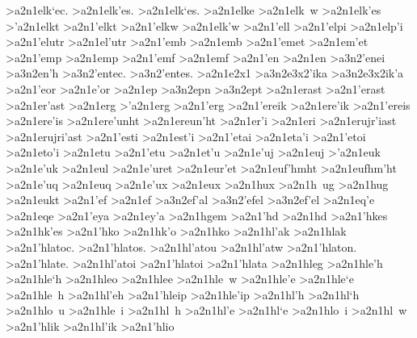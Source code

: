 {>a2n1elk`ec.
>a2n1elk'es.
>a2n1elk`es.
>a2n1elke
>a2n1elk~w
>a2n1elk'es
>'a2n1elkt   		%
>a2n1'elkt
>a2n1'elkw		%
>a2n1elk'w
>a2n1'ell    		%
>a2n1'elpi		%
>a2n1elp'i
>a2n1'elutr %
>a2n1el'utr
>a2n1'emb  		%
>a2n1emb
>a2n1'emet 		%
>a2n1em'et
>a2n1'emp  		%
>a2n1emp
>a2n1'emf  		%
>a2n1emf
>a2n1'en   		%
>a2n1en
	>a3n2'enei  		%
	>a3n2en'h   		%
	>a3n2'entec. 		%
	>a3n2'entes.
>a2n1e2x1  		%
	>a3n2e3x2'ika 		%
	>a3n2e3x2ik'a
>a2n1'eor		%
>a2n1e'or
>a2n1ep    		%
	>a3n2epn  	%
	>a3n2ept  	%
>a2n1erast  		%
>a2n1'erast 		%
>a2n1er'ast
>a2n1erg    		%
>'a2n1erg   		%
>a2n1'erg
>a2n1'ereik 		%
>a2n1ere'ik
>a2n1'ereis 		%
>a2n1ere'is
>a2n1ere'unht 		%
>a2n1ereun'ht
>a2n1er'i   		%
>a2n1eri
>a2n1erujr'iast   	%
>a2n1erujri'ast
>a2n1'esti  		%
>a2n1est'i
>a2n1'etai  		%
>a2n1eta'i
>a2n1'etoi  		%
>a2n1eto'i
>a2n1etu    		%
>a2n1'etu  		%
>a2n1et'u
>a2n1e'uj   		%
>a2n1euj
>'a2n1euk   		%
>a2n1e'uk
>a2n1eul    		%
>a2n1e'uret 		%
>a2n1eur'et
>a2n1euf'hmht 		%
>a2n1eufhm'ht
 >a2n1e'uq   		%
 >a2n1euq
 >a2n1e'ux  		%
 >a2n1eux
 >a2n1hux  		%
 >a2n1h~ug		%
 >a2n1hug
 >a2n1eukt		%
>a2n1'ef    		%
>a2n1ef
	>a3n2ef'al  	%
	>a3n2'efel  	%
	>a3n2ef'el
>a2n1eq'e   		%
>a2n1eqe
>a2n1'eya   		%
>a2n1ey'a
>a2n1hgem   		%
>a2n1'hd    		%
>a2n1hd
>a2n1'hkes    		%
>a2n1hk'es
>a2n1'hko		%
>a2n1hk'o 
>a2n1hko
>a2n1hl'ak    		%
>a2n1hlak
>a2n1'hlatoc. 		%
>a2n1'hlatos.
>a2n1hl'atou
>a2n1hl'atw
>a2n1'hlaton.
>a2n1'hlate.
>a2n1hl'atoi
>a2n1'hlatoi
>a2n1'hlata
>a2n1hleg		%
>a2n1hle'h    		%
>a2n1hle`h
>a2n1hleo
>a2n1hlee
>a2n1hle~w
>a2n1hle'e
>a2n1hle`e
>a2n1hle~h
>a2n1hl'eh  	 	%
>a2n1'hleip		%
>a2n1hle'ip
>a2n1hl'h		%
>a2n1hl`h
>a2n1hlo~u
>a2n1hle~i
>a2n1hl~h
>a2n1hl'e
>a2n1hl`e
>a2n1hlo~i
>a2n1hl~w
>a2n1'hlik		%
>a2n1hl'ik
>a2n1'hlio 		%
}
